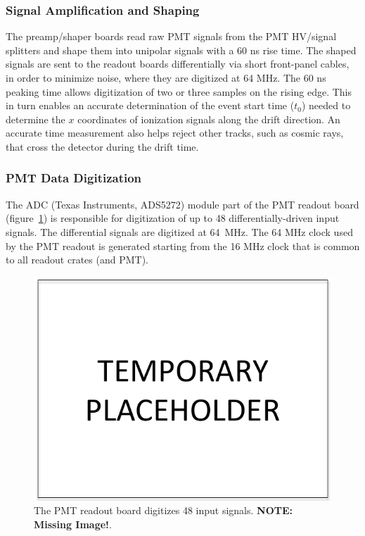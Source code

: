 \subsubsection{\label{sec:PMTamp}Signal Amplification and Shaping}

The preamp/shaper boards read raw PMT signals from the PMT HV/signal splitters and shape them into unipolar signals with a 60 ns rise time. The shaped signals are sent to the \lartpc readout boards differentially via short front-panel cables, in order to minimize noise, where they are digitized at 64 MHz. The 60 ns peaking time allows digitization of two or three samples on the rising edge. This in turn enables an accurate determination of the event start time ($t_0$) needed to determine the $x$ coordinates of ionization signals along the drift direction. An accurate time measurement also helps reject other tracks, such as cosmic rays, that cross the detector during the drift time.

\subsubsection{PMT Data Digitization}
\label{sec:pmtdigit}

The ADC (Texas Instruments, ADS5272) module part of the PMT readout board (figure~\ref{fig:readout_8}) is responsible for digitization of up to 48 differentially-driven input signals. The differential signals are digitized at 64~MHz. The 64 MHz clock used by the PMT readout is generated starting from the 16 MHz clock that is common to all readout crates (\lartpc and PMT). 


\begin{figure}
\centering
\includegraphics[width=0.8\linewidth]{./figures/temp}%
\caption{\label{fig:readout_8}The PMT readout board digitizes 48 input signals. \textbf{NOTE:  Missing Image!}.}
\end{figure}

